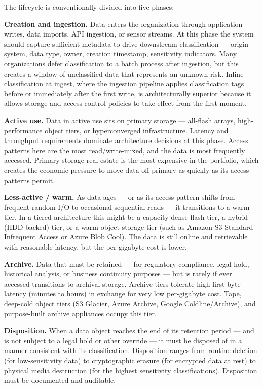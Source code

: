 The lifecycle is conventionally divided into five phases:

\textbf{Creation and ingestion.} Data enters the organization through application writes, data imports, API ingestion, or sensor streams. At this phase the system should capture sufficient metadata to drive downstream classification --- origin system, data type, owner, creation timestamp, sensitivity indicators. Many organizations defer classification to a batch process after ingestion, but this creates a window of unclassified data that represents an unknown risk. Inline classification at ingest, where the ingestion pipeline applies classification tags before or immediately after the first write, is architecturally superior because it allows storage and access control policies to take effect from the first moment.

\textbf{Active use.} Data in active use sits on primary storage --- all-flash arrays, high-performance object tiers, or hyperconverged infrastructure. Latency and throughput requirements dominate architecture decisions at this phase. Access patterns here are the most read/write-mixed, and the data is most frequently accessed. Primary storage real estate is the most expensive in the portfolio, which creates the economic pressure to move data off primary as quickly as its access patterns permit.

\textbf{Less-active / warm.} As data ages --- or as its access pattern shifts from frequent random I/O to occasional sequential reads --- it transitions to a warm tier. In a tiered architecture this might be a capacity-dense flash tier, a hybrid (HDD-backed) tier, or a warm object storage tier (such as Amazon S3 Standard-Infrequent Access or Azure Blob Cool). The data is still online and retrievable with reasonable latency, but the per-gigabyte cost is lower.

\textbf{Archive.} Data that must be retained --- for regulatory compliance, legal hold, historical analysis, or business continuity purposes --- but is rarely if ever accessed transitions to archival storage. Archive tiers tolerate high first-byte latency (minutes to hours) in exchange for very low per-gigabyte cost. Tape, deep-cold object tiers (S3 Glacier, Azure Archive, Google Coldline/Archive), and purpose-built archive appliances occupy this tier.

\textbf{Disposition.} When a data object reaches the end of its retention period --- and is not subject to a legal hold or other override --- it must be disposed of in a manner consistent with its classification. Disposition ranges from routine deletion (for low-sensitivity data) to cryptographic erasure (for encrypted data at rest) to physical media destruction (for the highest sensitivity classifications). Disposition must be documented and auditable.

